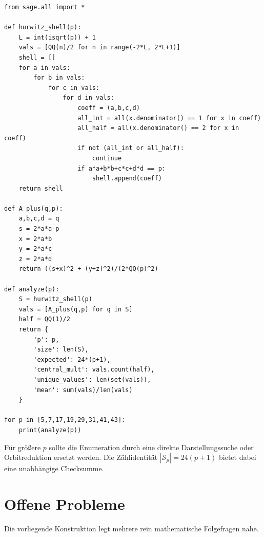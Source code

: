 \documentclass[11pt,a4paper]{article}
\theoremstyle{definition}
\begin{document}
\lstset{language=Python,basicstyle=\ttfamily\small,breaklines=true,frame=single,showstringspaces=false,columns=fullflexible}
\begin{lstlisting}
from sage.all import *

def hurwitz_shell(p):
    L = int(isqrt(p)) + 1
    vals = [QQ(n)/2 for n in range(-2*L, 2*L+1)]
    shell = []
    for a in vals:
        for b in vals:
            for c in vals:
                for d in vals:
                    coeff = (a,b,c,d)
                    all_int = all(x.denominator() == 1 for x in coeff)
                    all_half = all(x.denominator() == 2 for x in coeff)
                    if not (all_int or all_half):
                        continue
                    if a*a+b*b+c*c+d*d == p:
                        shell.append(coeff)
    return shell

def A_plus(q,p):
    a,b,c,d = q
    s = 2*a*a-p
    x = 2*a*b
    y = 2*a*c
    z = 2*a*d
    return ((s+x)^2 + (y+z)^2)/(2*QQ(p)^2)

def analyze(p):
    S = hurwitz_shell(p)
    vals = [A_plus(q,p) for q in S]
    half = QQ(1)/2
    return {
        'p': p,
        'size': len(S),
        'expected': 24*(p+1),
        'central_mult': vals.count(half),
        'unique_values': len(set(vals)),
        'mean': sum(vals)/len(vals)
    }

for p in [5,7,17,19,29,31,41,43]:
    print(analyze(p))
\end{lstlisting}

Für größere $p$ sollte die Enumeration durch eine direkte Darstellungssuche oder Orbitreduktion ersetzt werden. Die Zählidentität $|\mathcal S_p|=24(p+1)$ bietet dabei eine unabhängige Checksumme.

\section{Offene Probleme}
Die vorliegende Konstruktion legt mehrere rein mathematische Folgefragen nahe.
\end{document}
